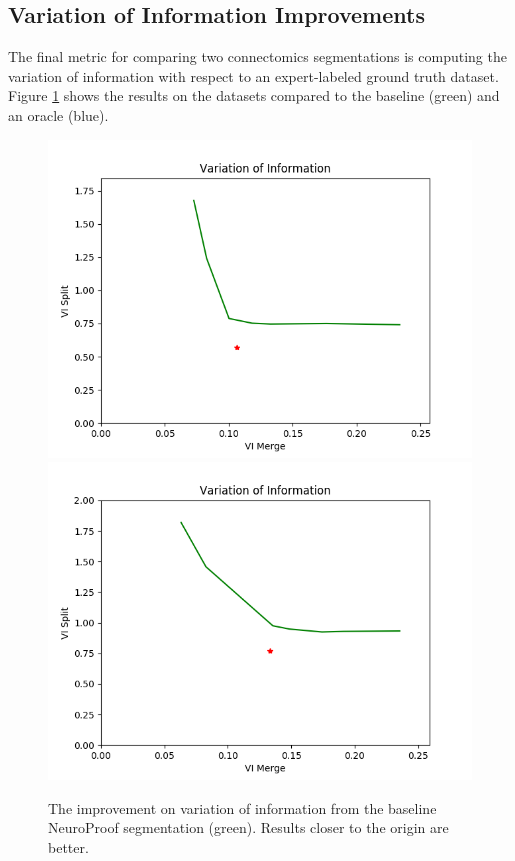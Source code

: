 \subsection{Variation of Information Improvements}

The final metric for comparing two connectomics segmentations is computing the variation of information with respect to an expert-labeled ground truth dataset. Figure \ref{fig:variation-of-information} shows the results on the datasets compared to the baseline (green) and an oracle (blue). 

\begin{figure}[t!]
	\centering
	\includegraphics[width=0.42\linewidth]{./figures/variation_of_information-train.png}
	\hspace{0.085\linewidth}
	\includegraphics[width=0.42\linewidth]{./figures/variation_of_information-test.png}
	\caption{The improvement on variation of information from the baseline NeuroProof segmentation (green). Results closer to the origin are better.}
	\label{fig:variation-of-information}
\end{figure}